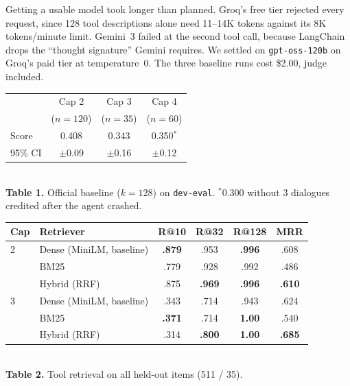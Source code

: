 \documentclass[10pt]{article}
\begin{document}
Getting a usable model took longer than planned. Groq's free tier rejected every request, since
128 tool descriptions alone need 11--14K tokens against its 8K tokens/minute limit. Gemini~3
failed at the second tool call, because LangChain drops the ``thought signature'' Gemini
requires. We settled on \texttt{gpt-oss-120b} on Groq's paid tier at temperature~0. The three
baseline runs cost \$2.00, judge included.

\vspace{0.2em}
\begin{minipage}[t]{0.40\textwidth}
\vspace{0pt}\centering\small
\begin{tabular}{@{}lccc@{}}
\toprule
& Cap 2 & Cap 3 & Cap 4 \\
 & ($n{=}120$) & ($n{=}35$) & ($n{=}60$) \\
\midrule
Score   & 0.408 & 0.343 & 0.350$^{\ast}$ \\
\midrule
95\% CI & $\pm$0.09 & $\pm$0.16 & $\pm$0.12 \\
\bottomrule
\end{tabular}\\[0.15em]
{\footnotesize \textbf{Table 1.} Official baseline ($k{=}128$) on \texttt{dev-eval}.
$^{\ast}$0.300 without 3 dialogues credited after the agent crashed.}
\end{minipage}\hfill
\begin{minipage}[t]{0.57\textwidth}
\vspace{0pt}\centering\small
\begin{tabular}{@{}llcccc@{}}
\toprule
Cap & Retriever & R@10 & R@32 & R@128 & MRR \\
\midrule
2 & Dense (MiniLM, baseline) & \textbf{.879} & .953 & \textbf{.996} & .608 \\
  & BM25                     & .779 & .928 & .992 & .486 \\
  & Hybrid (RRF)             & .875 & \textbf{.969} & \textbf{.996} & \textbf{.610} \\
\midrule
3 & Dense (MiniLM, baseline) & .343 & .714 & .943 & .624 \\
  & BM25                     & \textbf{.371} & .714 & \textbf{1.00} & .540 \\
  & Hybrid (RRF)             & .314 & \textbf{.800} & \textbf{1.00} & \textbf{.685} \\
\bottomrule
\end{tabular}\\[0.15em]
{\footnotesize \textbf{Table 2.} Tool retrieval on all held-out items (511 / 35).}
\end{minipage}
\end{document}
